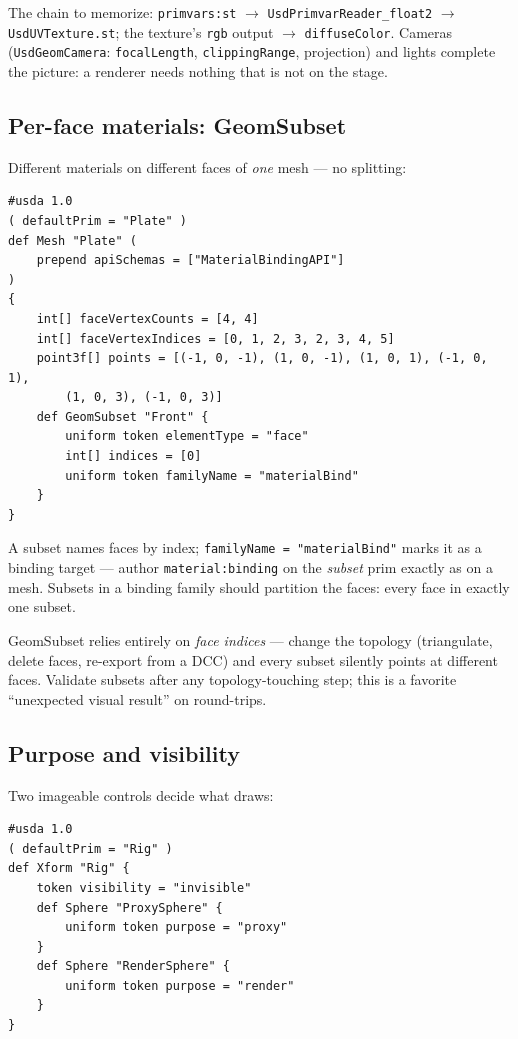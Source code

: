 \noindent The chain to memorize: \texttt{primvars:st} $\to$
\texttt{UsdPrimvarReader\_float2} $\to$ \texttt{UsdUVTexture.st}; the
texture's \texttt{rgb} output $\to$ \texttt{diffuseColor}. Cameras
(\texttt{UsdGeomCamera}: \texttt{focalLength}, \texttt{clippingRange},
projection) and lights complete the picture: a renderer needs nothing that
is not on the stage.

\subsection{Per-face materials: GeomSubset}\label{sec:vis-subset}
Different materials on different faces of \emph{one} mesh
--- no splitting:

\begin{lstlisting}
#usda 1.0
( defaultPrim = "Plate" )
def Mesh "Plate" (
    prepend apiSchemas = ["MaterialBindingAPI"]
)
{
    int[] faceVertexCounts = [4, 4]
    int[] faceVertexIndices = [0, 1, 2, 3, 2, 3, 4, 5]
    point3f[] points = [(-1, 0, -1), (1, 0, -1), (1, 0, 1), (-1, 0, 1),
        (1, 0, 3), (-1, 0, 3)]
    def GeomSubset "Front" {
        uniform token elementType = "face"
        int[] indices = [0]
        uniform token familyName = "materialBind"
    }
}
\end{lstlisting}

\noindent A subset names faces by index; \texttt{familyName =
"materialBind"} marks it as a binding target --- author
\texttt{material:binding} on the \emph{subset} prim exactly as on a mesh.
Subsets in a binding family should partition the faces: every face in
exactly one subset.

\begin{Gotcha}
GeomSubset relies entirely on \emph{face indices} --- change the topology
(triangulate, delete faces, re-export from a DCC) and every subset silently
points at different faces. Validate subsets after any topology-touching
step; this is a favorite ``unexpected visual result'' on round-trips.
\end{Gotcha}

\subsection{Purpose and visibility}\label{sec:vis-purpose}
Two imageable controls decide what draws:

\begin{lstlisting}
#usda 1.0
( defaultPrim = "Rig" )
def Xform "Rig" {
    token visibility = "invisible"
    def Sphere "ProxySphere" {
        uniform token purpose = "proxy"
    }
    def Sphere "RenderSphere" {
        uniform token purpose = "render"
    }
}
\end{lstlisting}

